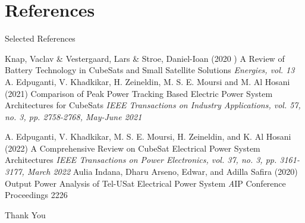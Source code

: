 \documentclass[aspectratio=169]{beamer}
\begin{document}
				\section{References}
				\begin{frame}{Selected References}
					
					\begin{thebibliography}{9}
						
						Knap, Vaclav \& Vestergaard, Lars \& Stroe, Daniel-Ioan (2020	)
						\newblock A Review of Battery Technology in CubeSats
						and Small Satellite Solutions
						\newblock \emph{Energies, vol. 13}	
						A. Edpuganti, V. Khadkikar, H. Zeineldin, M. S. E. Moursi and M. Al Hosani (2021)
						\newblock Comparison of Peak Power Tracking Based Electric Power System Architectures for CubeSats
						\newblock \emph{IEEE Transactions on Industry Applications, vol. 57, no. 3, pp. 2758-2768, May-June 2021}
						
						A. Edpuganti, V. Khadkikar, M. S. E. Moursi, H. Zeineldin,  and K. Al Hosani (2022)
						\newblock A Comprehensive Review on CubeSat Electrical Power System Architectures
						\newblock \emph { IEEE Transactions on Power Electronics, vol. 37, no. 3, pp. 3161-3177, March 2022}
						Aulia Indana, Dharu Arseno, Edwar, and Adilla Safira (2020)
						\newblock Output Power Analysis of Tel-USat Electrical Power System 
						\newblock \emph  AIP Conference Proceedings 2226
					\end{thebibliography}
				\end{frame}
						
						
						
						
						
						
						
						
						
				
				\begin{frame}
					\huge \center Thank You
					
				\end{frame}
			
\end{document}
